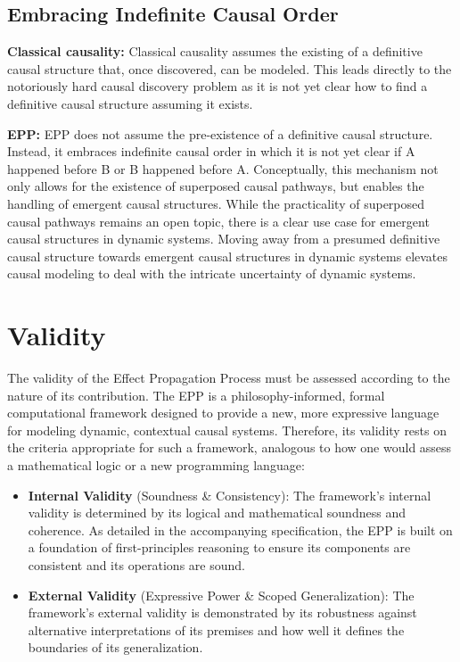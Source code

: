 \documentclass{article}
\begin{document}
\subsection{Embracing Indefinite Causal Order}

\textbf{Classical causality:} 
Classical causality assumes the existing of a definitive causal structure that, once discovered, can be modeled. This leads directly to the notoriously hard causal discovery problem as it is not yet clear how to find a definitive causal structure assuming it exists.

\textbf{EPP:} 
EPP does not assume the pre-existence of a definitive causal structure. Instead, it embraces indefinite causal order in which it is not yet clear if A happened before B or B happened before A. Conceptually, this mechanism not only allows for the existence of superposed causal pathways, but enables the handling of emergent causal structures. While the practicality of superposed causal pathways remains an open topic, there is a clear use case for emergent causal structures in dynamic systems. Moving away from a presumed definitive causal structure towards emergent causal structures in dynamic systems elevates causal modeling to deal with the intricate uncertainty of dynamic systems.

\section{Validity}
\label{sec:validity}

The validity of the Effect Propagation Process must be assessed according to the nature of its contribution. The EPP is
a philosophy-informed, formal computational framework designed to provide a new, more expressive language for modeling
dynamic, contextual causal systems. Therefore, its validity rests on the criteria appropriate for such a framework,
analogous to how one would assess a mathematical logic or a new programming language:

\begin{itemize}
    \item \textbf{Internal Validity} (Soundness & Consistency): The framework's internal validity is determined by its logical and
  mathematical soundness and coherence. As detailed in the accompanying specification, the EPP is built on a foundation
  of first-principles reasoning to ensure its components are consistent and its operations are sound.
  \item \textbf{External Validity} (Expressive Power & Scoped Generalization): The framework's external validity is demonstrated by its
  robustness against alternative interpretations of its premises and how well it defines the boundaries of its
  generalization.
\end{itemize}
\end{document}
